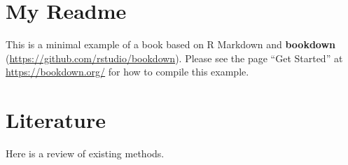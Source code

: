 \documentclass[]{book}
\begin{document}
\hypertarget{my-readme}{%
\chapter{My Readme}\label{my-readme}}

This is a minimal example of a book based on R Markdown and \textbf{bookdown} (\url{https://github.com/rstudio/bookdown}). Please see the page ``Get Started'' at \url{https://bookdown.org/} for how to compile this example.

\hypertarget{literature}{%
\chapter{Literature}\label{literature}}

Here is a review of existing methods.


\end{document}
